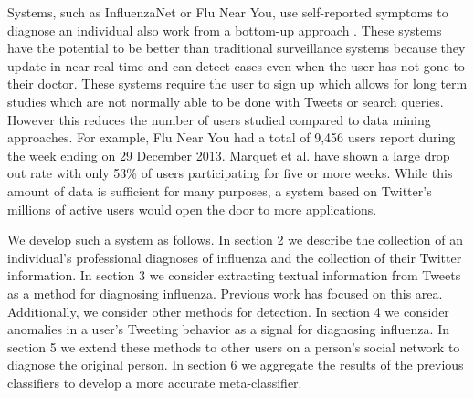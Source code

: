 \documentclass{acm_proc_article-sp}
\begin{document}
Systems, such as InfluenzaNet or Flu Near You, use self-reported symptoms to diagnose an individual also work from a bottom-up approach \cite{Marquet:2005tb,VanNoort:2007uk}. These systems have the potential to be better than traditional surveillance systems because they update in near-real-time and can detect cases even when the user has not gone to their doctor. These systems require the user to sign up which allows for long term studies which are not normally able to be done with Tweets or search queries. However this reduces the number of users studied compared to data mining approaches. For example, Flu Near You had a total of 9,456 users report during the week ending on 29 December 2013. Marquet et al. \cite{Marquet:2005tb} have shown a large drop out rate with only 53\% of users participating for five or more weeks. While this amount of data is sufficient for many purposes, a system based on Twitter's millions of active users would open the door to more applications.


%
%

We develop such a system as follows. In section 2 we describe the collection of an individual's professional diagnoses of influenza and the collection of their Twitter information. In section 3 we consider extracting textual information from Tweets as a method for diagnosing influenza. Previous work has focused on this area. Additionally, we consider other methods for detection. In section 4 we consider anomalies in a user's Tweeting behavior as a signal for diagnosing influenza. In section 5 we extend these methods to other users on a person's social network to diagnose the original person. In section 6 we aggregate the results of the previous classifiers to develop a more accurate meta-classifier.




\end{document}
